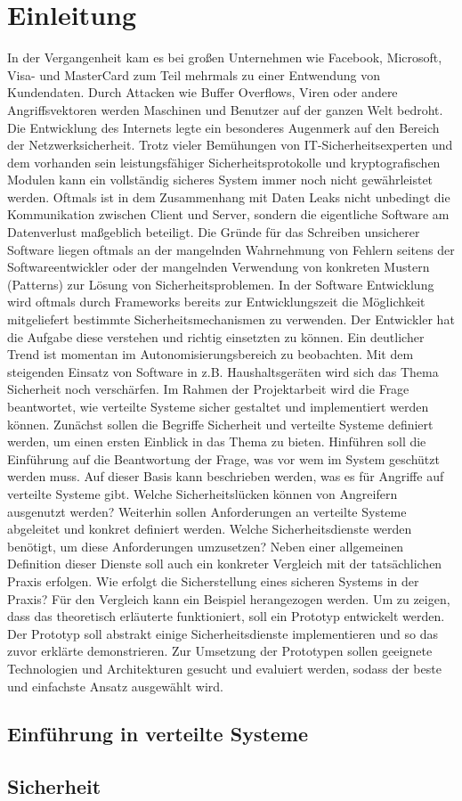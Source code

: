 
\chapter{Einleitung}

In der Vergangenheit kam es bei großen Unternehmen wie Facebook, Microsoft, Visa- und
MasterCard zum Teil mehrmals zu einer Entwendung von Kundendaten. Durch Attacken wie
Buffer Overflows, Viren oder andere Angriffsvektoren werden Maschinen und Benutzer auf
der ganzen Welt bedroht. Die Entwicklung des Internets legte ein besonderes Augenmerk auf
den Bereich der Netzwerksicherheit. Trotz vieler Bemühungen von IT-Sicherheitsexperten
und dem vorhanden sein leistungsfähiger Sicherheitsprotokolle und kryptografischen
Modulen kann ein vollständig sicheres System immer noch nicht gewährleistet werden.
Oftmals ist in dem Zusammenhang mit Daten Leaks nicht unbedingt die Kommunikation
zwischen Client und Server, sondern die eigentliche Software am Datenverlust maßgeblich
beteiligt. Die Gründe für das Schreiben unsicherer Software liegen oftmals an der mangelnden
Wahrnehmung von Fehlern seitens der Softwareentwickler oder der mangelnden
Verwendung von konkreten Mustern (Patterns) zur Lösung von Sicherheitsproblemen. In der
Software Entwicklung wird oftmals durch Frameworks bereits zur Entwicklungszeit die
Möglichkeit mitgeliefert bestimmte Sicherheitsmechanismen zu verwenden. Der Entwickler
hat die Aufgabe diese verstehen und richtig einsetzten zu können. Ein deutlicher Trend ist
momentan im Autonomisierungsbereich zu beobachten. Mit dem steigenden Einsatz von
Software in z.B. Haushaltsgeräten wird sich das Thema Sicherheit noch verschärfen. 
\newline
Im Rahmen der Projektarbeit wird die Frage beantwortet, wie
verteilte Systeme sicher gestaltet und implementiert werden können. 
Zunächst sollen die Begriffe Sicherheit und verteilte Systeme definiert werden, 
um einen ersten Einblick in das Thema zu bieten. 
Hinführen soll die Einführung auf die Beantwortung der Frage, 
was vor wem im System geschützt werden muss. Auf dieser Basis kann beschrieben werden, 
was es für Angriffe auf verteilte Systeme gibt. 
Welche Sicherheitslücken können von Angreifern ausgenutzt werden? 
Weiterhin sollen Anforderungen an verteilte Systeme abgeleitet und konkret definiert werden. 
Welche Sicherheitsdienste werden benötigt, um diese Anforderungen umzusetzen? 
Neben einer allgemeinen Definition dieser Dienste soll auch ein konkreter Vergleich mit der tatsächlichen Praxis erfolgen. 
Wie erfolgt die Sicherstellung eines sicheren Systems in der Praxis? 
Für den Vergleich kann ein Beispiel herangezogen werden. 
Um zu zeigen, dass das theoretisch erläuterte funktioniert, soll ein Prototyp entwickelt werden. 
Der Prototyp soll abstrakt einige Sicherheitsdienste implementieren und so das zuvor erklärte demonstrieren. 
Zur Umsetzung der Prototypen sollen geeignete Technologien und Architekturen gesucht und evaluiert werden, 
sodass der beste und einfachste Ansatz ausgewählt wird.


\section{Einführung in verteilte Systeme}

\section{Sicherheit}